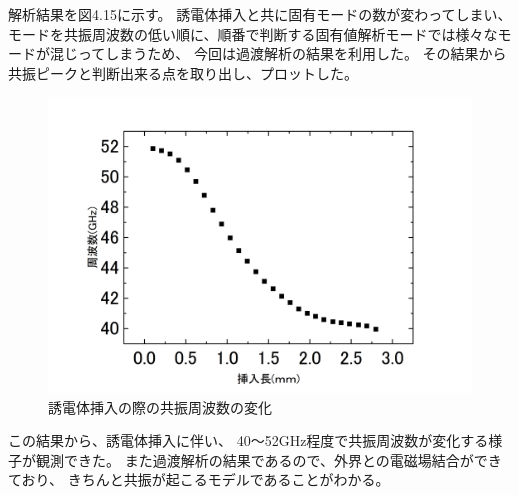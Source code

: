 解析結果を図4.15に示す。
誘電体挿入と共に固有モードの数が変わってしまい、モードを共振周波数の低い順に、順番で判断する固有値解析モードでは様々なモードが混じってしまうため、
今回は過渡解析の結果を利用した。
その結果から共振ピークと判断出来る点を取り出し、プロットした。

\vspace{10 mm}

\begin{figure}[h]
  \begin{center}
    \includegraphics[width=12cm]{./image/plot2.jpg}
    \caption{誘電体挿入の際の共振周波数の変化}
    \label{fig:result}
  \end{center}
\end{figure}

この結果から、誘電体挿入に伴い、
40〜52GHz程度で共振周波数が変化する様子が観測できた。
また過渡解析の結果であるので、外界との電磁場結合ができており、
きちんと共振が起こるモデルであることがわかる。


%
%
%
%
%
